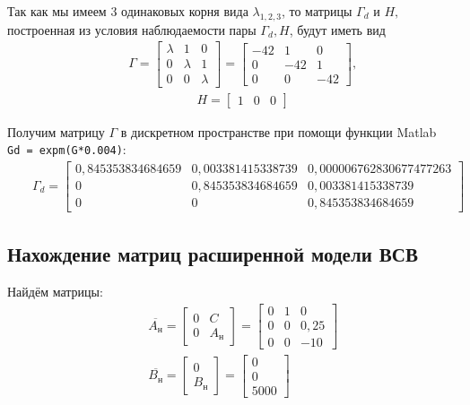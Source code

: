 \documentclass[fleqn, a4paper, 11pt, russian]{article}
\begin{document}
	Так как мы имеем 3 одинаковых корня вида $\lambda_{1, 2, 3}$, то матрицы $\Gamma_d$ и $H,$ построенная из условия наблюдаемости пары $\Gamma_d, H$, будут иметь вид
	\begin{align}
		&&\Gamma = \begin{bmatrix}
			\lambda & 1 & 0\\
			0 & \lambda & 1\\
			0 & 0 & \lambda
		\end{bmatrix} = \begin{bmatrix}
			-42 & 1 & 0\\
			0 & -42 & 1\\
			0 & 0 & -42
		\end{bmatrix},
	\end{align}
	\begin{align}
		&&H = \begin{bmatrix}
			1 & 0 & 0
		\end{bmatrix}
	\end{align}
	
	Получим матрицу $\Gamma$ в дискретном пространстве при помощи функции Matlab\\ \texttt{Gd = expm(G*0.004)}:
	\begin{align}
		&&\Gamma_d = \begin{bmatrix}
			0,845353834684659 & 0,003381415338739 & 0,000006762830677477263\\
			0 & 0,845353834684659 & 0,003381415338739\\
			0 & 0 & 0,845353834684659
		\end{bmatrix}
	\end{align}
	
	\subsection{Нахождение матриц расширенной модели ВСВ}
	Найдём матрицы:
	\begin{align}
		&&\overline{A_\text{н}} = \begin{bmatrix}
			0 & C\\
			0 & A_\text{н}
		\end{bmatrix} = \begin{bmatrix}
			0 & 1 & 0\\
			0 & 0 & 0,25\\
			0 & 0 & -10
		\end{bmatrix}\\
		&&\overline{B_\text{н}} = \begin{bmatrix}
			0\\
			B_\text{н}
		\end{bmatrix} = \begin{bmatrix}
			0\\
			0\\
			5000
		\end{bmatrix}
	\end{align}
	
\end{document}

